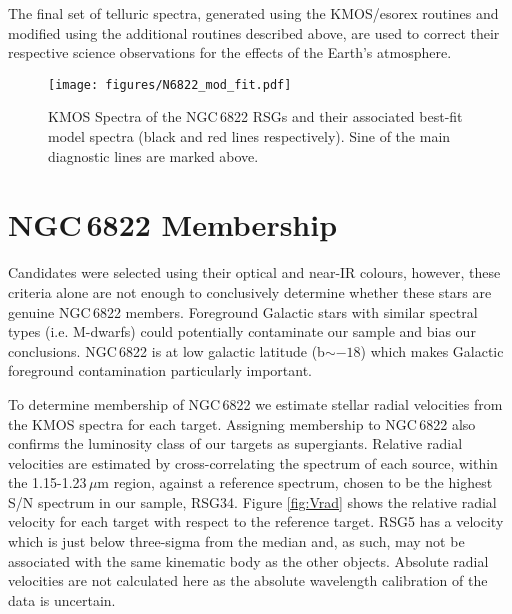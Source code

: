 \documentclass[iop]{emulateapj}
\begin{document}
The final set of telluric spectra,
generated using the KMOS/esorex routines and modified using the additional routines described above,
are used to correct their respective science observations for the effects of the Earth's atmosphere.



\begin{figure*}
 \begin{center}
\texttt{[image: figures/N6822\_mod\_fit.pdf]}
\caption{KMOS Spectra of the NGC\,6822 RSGs and their associated best-fit model spectra
(black and red lines respectively).
Sine of the main diagnostic lines are marked above.
         }
\label{fig:model_fits}
\end{center}
\end{figure*}




\section{NGC\,6822 Membership} %
\label{sec:membership}
Candidates were selected using their optical and near-IR colours,
however, these criteria alone are not enough to conclusively determine whether these stars are genuine NGC\,6822 members.
Foreground Galactic stars with similar spectral types (i.e. M-dwarfs) could potentially contaminate our sample and bias our conclusions.
NGC\,6822 is at low galactic latitude (b$\sim -18$) which makes Galactic foreground contamination particularly important.

To determine membership of NGC\,6822 we estimate stellar radial velocities from the KMOS spectra for each target.
Assigning membership to NGC\,6822 also confirms the luminosity class of our targets as supergiants.
Relative radial velocities are estimated by cross-correlating the spectrum of each source,
within the 1.15-1.23\,$\mu$m region,
against a reference spectrum,
chosen to be the highest S/N spectrum in our sample, RSG34.
Figure
\ref{fig:Vrad} shows the relative radial velocity for each target with respect to the reference target.
RSG5 has a velocity which is just below three-sigma from the median
and, as such, may not be associated with the same kinematic body as the other objects.
Absolute radial velocities are not calculated here as the absolute wavelength calibration of the data is uncertain.
\end{document}
